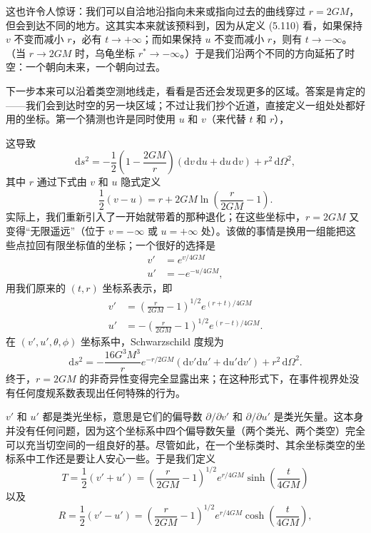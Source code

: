 这也许令人惊讶：我们可以自洽地沿指向未来或指向过去的曲线穿过 $r = 2GM$，但会到达不同的地方。这其实本来就该预料到，因为从定义 (5.110) 看，如果保持 $v$ 不变而减小 $r$，必有 $t \to +\infty$；而如果保持 $u$ 不变而减小 $r$，则有 $t \to -\infty$。（当 $r \to 2GM$ 时，乌龟坐标 $r^* \to -\infty$。）于是我们沿两个不同的方向延拓了时空：一个朝向未来，一个朝向过去。

下一步本来可以沿着类空测地线走，看看是否还会发现更多的区域。答案是肯定的——我们会到达时空的另一块区域；不过让我们抄个近道，直接定义一组处处都好用的坐标。第一个猜测也许是同时使用 $u$ 和 $v$（来代替 $t$ 和 $r$），


这导致
\begin{equation*}
\mathrm{d}s^2 = -\frac{1}{2}\left(1 - \frac{2GM}{r}\right)\left(\mathrm{d}v\,\mathrm{d}u + \mathrm{d}u\,\mathrm{d}v\right) + r^2\,\mathrm{d}\Omega^2,
\tag{5.116}
\end{equation*}
其中 $r$ 通过下式由 $v$ 和 $u$ 隐式定义
\begin{equation*}
\frac{1}{2}(v - u) = r + 2GM\ln\left(\frac{r}{2GM} - 1\right).
\tag{5.117}
\end{equation*}
实际上，我们重新引入了一开始就带着的那种退化；在这些坐标中，$r = 2GM$ 又变得“无限遥远”（位于 $v = -\infty$ 或 $u = +\infty$ 处）。该做的事情是换用一组能把这些点拉回有限坐标值的坐标；一个很好的选择是
\begin{align*}
v' &= e^{v/4GM}\\
u' &= -e^{-u/4GM},
\tag{5.118}
\end{align*}
用我们原来的 $(t, r)$ 坐标系表示，即
\begin{align*}
v' &= \left(\frac{r}{2GM} - 1\right)^{1/2}e^{(r+t)/4GM}\\
u' &= -\left(\frac{r}{2GM} - 1\right)^{1/2}e^{(r-t)/4GM}.
\tag{5.119}
\end{align*}
在 $(v', u', \theta, \phi)$ 坐标系中，Schwarzschild 度规为
\begin{equation*}
\mathrm{d}s^2 = -\frac{16G^3M^3}{r}e^{-r/2GM}\left(\mathrm{d}v'\mathrm{d}u' + \mathrm{d}u'\mathrm{d}v'\right) + r^2\,\mathrm{d}\Omega^2.
\tag{5.120}
\end{equation*}
终于，$r = 2GM$ 的非奇异性变得完全显露出来；在这种形式下，在事件视界处没有任何度规系数表现出任何特殊的行为。

$v'$ 和 $u'$ 都是类光坐标，意思是它们的偏导数 $\partial/\partial v'$ 和 $\partial/\partial u'$ 是类光矢量。这本身并没有任何问题，因为这个坐标系中四个偏导数矢量（两个类光、两个类空）完全可以充当切空间的一组良好的基。尽管如此，在一个坐标类时、其余坐标类空的坐标系中工作还是要让人安心一些。于是我们定义
\begin{equation*}
T = \frac{1}{2}(v' + u') = \left(\frac{r}{2GM} - 1\right)^{1/2}e^{r/4GM}\sinh\left(\frac{t}{4GM}\right)
\tag{5.121}
\end{equation*}
以及
\begin{equation*}
R = \frac{1}{2}(v' - u') = \left(\frac{r}{2GM} - 1\right)^{1/2}e^{r/4GM}\cosh\left(\frac{t}{4GM}\right),
\tag{5.122}
\end{equation*}

